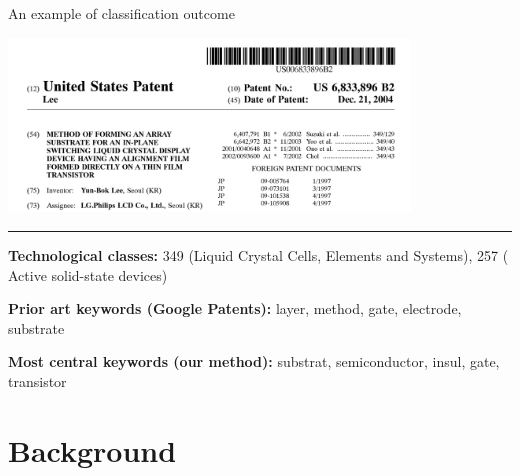 \documentclass{beamer}
\begin{document}
\begin{frame}{An example of classification outcome}
    \begin{center}
	\includegraphics[width=0.8\textwidth]{figures/6833896.png}
	\end{center}
	
	\medskip
	\hrule
	
\medskip
	
	\textbf{Technological classes:} 349 (Liquid Crystal Cells, Elements and Systems), 257 (	Active solid-state devices)
	
	\smallskip
	
	\textbf{Prior art keywords (Google Patents):} layer, method, gate, electrode, substrate
	
	\smallskip
	
	\textbf{Most central keywords (our method):} substrat, semiconductor, insul, gate, transistor
		
	
\end{frame}


\section{Background}

    
\end{document}
